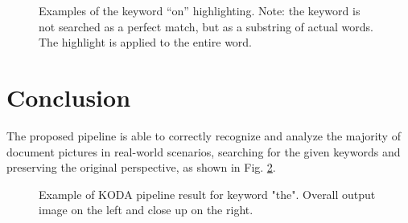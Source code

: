 \documentclass[a4paper]{article}
\begin{document}
\begin{figure}[H]
	\caption{ Examples of the keyword “on” highlighting. Note: the keyword is not searched as a perfect match, but as a substring of actual words. The highlight is applied to the entire word.}
	\label{fig:keywordhighliting2}
\end{figure}

\section{Conclusion}

The proposed pipeline is able to correctly recognize and analyze the majority of document pictures in real-world scenarios, searching for the given keywords and preserving the original perspective, as shown in Fig. \ref{fig:result}.

\begin{figure}[H]
	\caption{Example of KODA pipeline result for keyword "the". Overall output image on the left and close up on the right.}
	\label{fig:result}
\end{figure}
\end{document}
